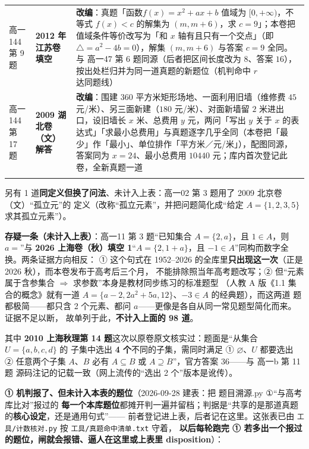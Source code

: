 \documentclass[a4paper,11pt]{article}
\begin{document}
\begin{xltabular}{\textwidth}{@{}>{\raggedright\arraybackslash}p{2.85cm}>{\raggedright\arraybackslash}p{3.99cm}>{\raggedright\arraybackslash}p{7.89cm}@{}}
高一144 第 9 题 & \textbf{2012 年江苏卷填空} & \textbf{改编}：真题「函数\(f(x)=x^2+ax+b\) 值域为 \([0,\allowbreak +\allowbreak \infty)\)，不等式 \(f(x)<c\) 的解集为 \((m,m+\allowbreak 6)\)，求 \(c=\allowbreak 9\)」；本卷把值域条件等价改写为「和 \(x\) 轴有且只有一个交点」（即 \(\triangle=a^2-4b=\allowbreak 0\)），解集 \((m,m+\allowbreak 6)\) 与答案 \(c=\allowbreak 9\) 全同。与 高一47 第 6 题同源（后者把区间长度改为 \(8\)、答案 \(16\)），按出处栏归并为同一道真题的新题位（机判命中 \(r\) 达同题线） \\ \addlinespace[1pt]
高一144 第 17 题 & \textbf{2009 湖北卷（文）解答} & \textbf{改编}：围建 \(360\) 平方米矩形场地、一面利用旧墙（维修费 \(45\) 元/米）、另三面新建（\(180\) 元/米）、对面新墙留 \(2\) 米进出口，设旧墙长 \(x\) 米、总费用 \(y\) 元，两问「写出 \(y\) 关于 \(x\) 的表达式」「求最小总费用」与真题逐字几乎全同（本卷把「最少」作「最小」、单位排作「平方米／元/米」），配图同源，答案同为 \(x=\allowbreak 24\)、最小总费用 \(10440\) 元；库内首次登记此卷，全新真题一道 \\ \addlinespace[1pt]
\end{xltabular}

另有 1 道\textbf{同定义但换了问法}、未计入上表：高一02 第 3 题用了 2009 北京卷（文）``孤立元''的
定义（改称``孤立元素''，并把问题简化成``给定 \(A=\{1,2,3,5\}\) 求其孤立元素''）。

\textbf{存疑一条（未计入上表）}：高一11 第 3 题``已知集合 \(A=\{2,a\}\)，且 \(1\in A\)，则 \(a=\)''与
\textbf{2026 上海卷（秋）填空 1}``\(A=\{2,1+a\}\)，且 \(-1\in A\)''同构而数字全换。两条证据方向相反：
① 这个句式在 1952--2026 的全库里\textbf{只出现这一次}（正是 2026 秋），而本卷发布于高考后三个月，
不能排除照当年高考题改写；② 但``元素属于含参集合 $\Rightarrow$ 求参数''本身是教材同步练习的标准题型
（人教 A 版《1.1 集合的概念》就有一道 \(A=\{a-2,2a^2+5a,12\}\)、\(-3\in A\) 的经典题），而这两道
题都极简------都只含 2 个元素、都问 \(a\)------更像是各自从同一常见题型简化而来。证据不足以断，
故单列于此，\textbf{不计入上面的 98 道}。

其中 \textbf{2010 上海秋理第 14 题}这次以原卷原文核实过：题面是``从集合 \(U=\{a,b,c,d\}\) 的
子集中选出 \textbf{4 个}不同的子集，需同时满足 ① \(\varnothing\)、\(U\) 都要选出 ② 任意两个子集
\(A\)、\(B\) 必有 \(A\subseteq B\) 或 \(A\supseteq B\)''，官方答案 36------与 高一b 第 11 题
源码注记的记载一致（网上流传的``选出 2 个''版本是讹传）。

\textbf{① 机判报了、但未计入本表的题位}（2026-09-28 建表：把 题目溯源.py ①``与高考库比对''报过的
\textbf{每一个本库题位}都摊开判一遍并留档；判据是``共享的是那道真题的\textbf{核心设定}，还是通用句式''------
前者登记进上表，后者记在这里。这张表已由 \texttt{工具/\allowbreak{}计数核对.py} 按 \texttt{工具/\allowbreak{}真题命中清单.txt} 守着，
\textbf{以后每轮跑完 ① 若多出一个报过的题位，闸就会报错、逼人在这里或上表里 disposition}）：
\end{document}

